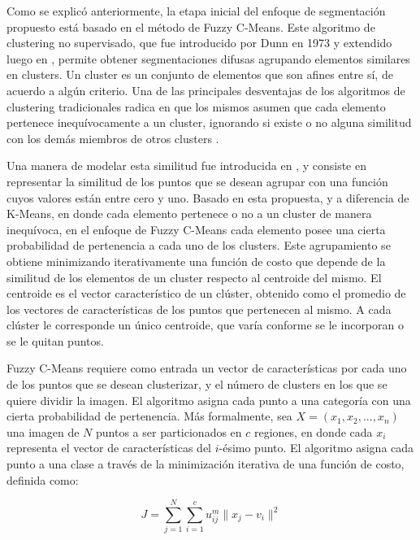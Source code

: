 \label{Introduccion}

Como se explicó anteriormente, la etapa inicial del enfoque de segmentación propuesto está basado en el método de Fuzzy C-Means. Este algoritmo de clustering no supervisado, que fue introducido por Dunn en 1973 \citep{dunn1973fuzzy} y extendido luego en \citep{bezdek1984fcm}, permite obtener segmentaciones difusas agrupando elementos similares en clusters. Un cluster es un conjunto de elementos que son afines entre sí, de acuerdo a algún criterio. Una de las principales desventajas de los algoritmos de clustering tradicionales radica en que los mismos asumen que cada elemento pertenece inequívocamente a un cluster, ignorando si existe o no alguna similitud con los demás miembros de otros clusters \citep{full1982fuzzy}.
 
Una manera de modelar esta similitud fue introducida en \citep{zadeh1965fuzzy}, y consiste en representar la similitud de los puntos que se desean agrupar con una función cuyos valores están entre cero y uno. Basado en esta propuesta, y a diferencia de K-Means, en donde cada elemento pertenece o no a un cluster de manera inequívoca, en el enfoque de Fuzzy C-Means cada elemento posee una cierta probabilidad de pertenencia a cada uno de los clusters. Este agrupamiento se obtiene minimizando iterativamente una función de costo que depende de la similitud de los elementos de un cluster respecto al centroide del mismo. El centroide es el vector característico de un clúster, obtenido como el promedio de los vectores de características de los puntos que pertenecen al mismo. A cada clúster le corresponde un único centroide, que varía conforme se le incorporan o se le quitan puntos.

Fuzzy C-Means requiere como entrada un vector de características por cada uno de los puntos que se desean clusterizar, y el número de clusters en los que se quiere dividir la imagen. El algoritmo asigna cada punto a una categoría con una cierta probabilidad de pertenencia. Más formalmente, sea $ X = (x_1, x_2, ..., x_n)$ una imagen de $N$ puntos a ser particionados en $c$ regiones, en donde cada $x_i$ representa el vector de características del $i$-ésimo punto. El algoritmo asigna cada punto a una clase a través de la minimización iterativa de una función de costo, definida como:

\[\label{eq:solve} J = \sum_{j=1}^{N} \sum_{i=1}^{c} u_{ij}^m \lVert x_j- v_i \rVert^2\]

